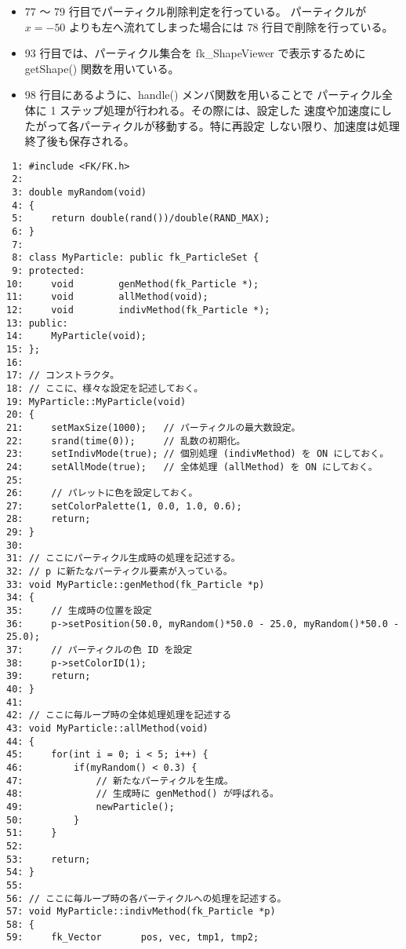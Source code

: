 \begin{itemize}
 \item 77 〜 79 行目でパーティクル削除判定を行っている。
	パーティクルが \(x = -50\) よりも左へ流れてしまった場合には
	78 行目で削除を行っている。

 \item 93 行目では、パーティクル集合を fk\_ShapeViewer で表示するために
	getShape() 関数を用いている。

 \item 98 行目にあるように、handle() メンバ関数を用いることで
	パーティクル全体に 1 ステップ処理が行われる。その際には、設定した
	速度や加速度にしたがって各パーティクルが移動する。特に再設定
	しない限り、加速度は処理終了後も保存される。

\end{itemize}

\begin{breakbox}
\begin{verbatim}
 1: #include <FK/FK.h>
 2: 
 3: double myRandom(void)
 4: {
 5:     return double(rand())/double(RAND_MAX);
 6: }
 7:  
 8: class MyParticle: public fk_ParticleSet {
 9: protected:
10:     void        genMethod(fk_Particle *);
11:     void        allMethod(void);
12:     void        indivMethod(fk_Particle *);
13: public:
14:     MyParticle(void);
15: };
16:  
17: // コンストラクタ。
18: // ここに、様々な設定を記述しておく。
19: MyParticle::MyParticle(void)
20: {
21:     setMaxSize(1000);   // パーティクルの最大数設定。
22:     srand(time(0));     // 乱数の初期化。
23:     setIndivMode(true); // 個別処理 (indivMethod) を ON にしておく。
24:     setAllMode(true);   // 全体処理 (allMethod) を ON にしておく。
25:  
26:     // パレットに色を設定しておく。
27:     setColorPalette(1, 0.0, 1.0, 0.6);
28:     return;
29: }
30:  
31: // ここにパーティクル生成時の処理を記述する。
32: // p に新たなパーティクル要素が入っている。
33: void MyParticle::genMethod(fk_Particle *p)
34: {
35:     // 生成時の位置を設定
36:     p->setPosition(50.0, myRandom()*50.0 - 25.0, myRandom()*50.0 - 25.0);
37:     // パーティクルの色 ID を設定
38:     p->setColorID(1);
39:     return;
40: }
41:  
42: // ここに毎ループ時の全体処理処理を記述する
43: void MyParticle::allMethod(void)
44: {
45:     for(int i = 0; i < 5; i++) {
46:         if(myRandom() < 0.3) {
47:             // 新たなパーティクルを生成。
48:             // 生成時に genMethod() が呼ばれる。
49:             newParticle();
50:         }
51:     }
52:  
53:     return;
54: }
55:  
56: // ここに毎ループ時の各パーティクルへの処理を記述する。
57: void MyParticle::indivMethod(fk_Particle *p)
58: {
59:     fk_Vector       pos, vec, tmp1, tmp2;

\end{verbatim}
\end{breakbox}
